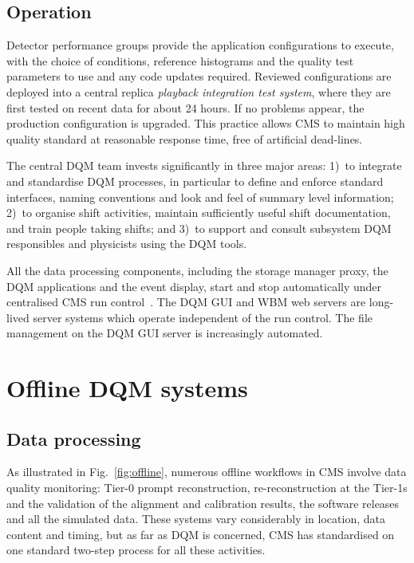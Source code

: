 \documentclass[a4paper]{jpconf}
\begin{document}
\subsection{Operation}

Detector performance groups provide the application configurations to execute,
with the choice of conditions, reference histograms and the quality test
parameters to use and any code updates required.  Reviewed configurations are
deployed into a central replica {\em playback integration test system}, where
they are first tested on recent data for about 24 hours.  If no problems
appear, the production configuration is upgraded.  This practice allows CMS to
maintain high quality standard at reasonable response time, free of artificial
dead-lines.

The central DQM team invests significantly in three major areas: 1)~to
integrate and standardise DQM processes, in particular to define and enforce
standard interfaces, naming conventions and look and feel of summary level
information; 2)~to organise shift activities, maintain sufficiently useful
shift documentation, and train people taking shifts; and 3)~to support and
consult subsystem DQM responsibles and physicists using the DQM tools.

All the data processing components, including the storage manager proxy, the
DQM applications and the event display, start and stop automatically under
centralised CMS run control~\cite{runcontrol}.  The DQM GUI and WBM web
servers are long-lived server systems which operate independent of the run
control.  The file management on the DQM GUI server is increasingly automated.


\section{Offline DQM systems}
\subsection{Data processing}

As illustrated in Fig.~\ref{fig:offline}, numerous offline workflows in CMS
involve data quality monitoring: Tier-0 prompt reconstruction,
re-reconstruction at the Tier-1s and the validation of the alignment and
calibration results, the software releases and all the simulated data.  These
systems vary considerably in location, data content and timing, but as far as
DQM is concerned, CMS has standardised on one standard two-step process for
all these activities.
\end{document}

